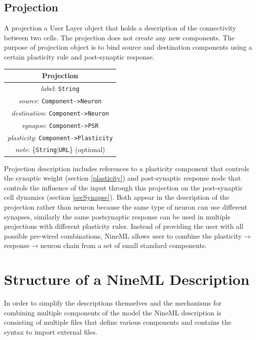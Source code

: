 \documentclass{article}
\begin{document}
\subsection{Projection}
\label{projections}

A projection a User Layer object that holds a description of the connectivity
between two cells. The projection does not create any new components. The
purpose of projection object is to bind source and destination components
using a certain plasticity rule and post-synaptic response.

\begin{table}[htb]
\center
\begin{tabular}{|c|}
\hline
\hline
Projection \\
\hline
\hline
{\em label}: {\tt String} \\
\hline
{\em source}: {\tt Component->Neuron} \\
\hline
{\em destination}: {\tt Component->Neuron} \\
\hline
{\em synapse}: {\tt Component->PSR} \\
\hline
{\em plasticity}: {\tt Component->Plasticity} \\
\hline
{\em note}: \{{\tt String}$|${\tt URL}\} (optional)\\
\hline
\end{tabular}
\end{table}

Projection description includes references to a plasticity component
that controls the synaptic weight (section \ref{plasticity}) and
post-synaptic response node that controls the influence of the input
through this projection on the post-synaptic cell dynamics (section
\ref{secSynapse}). Both appear in the description of the projection
rather than neuron because the same type of neuron can use different
synapses, similarly the same postsynaptic response can be used in
multiple projections with different plasticity rules. Instead of providing
the user with all possible pre-wired combinations, NineML allows user
to combine the plasticity$\rightarrow$response$\rightarrow$neuron
chain from a set of small standard components.

\section{Structure of a NineML Description}

In order to simplify the descriptions themselves and the mechanisms for
combining multiple components of the model the NineML description
is consisting of multiple files that define various components and
contains the syntax to import external files.
\end{document}
